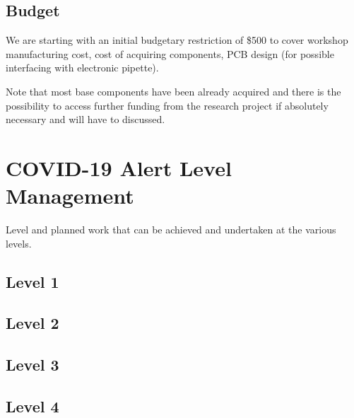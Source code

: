 \documentclass[11pt, a4paper, twoside, openright]{report}
\begin{document}
\subsection{Budget}
We are starting with an initial budgetary restriction of \$500 to cover workshop manufacturing cost, cost of acquiring components, PCB design (for possible interfacing with electronic pipette). 

Note that most base components have been already acquired and there is the possibility to access further funding from the research project if absolutely necessary and will have to discussed.  

\section{COVID-19 Alert Level Management}
Level and planned work that can be achieved and undertaken at the various levels.
\subsection{Level 1}
\subsection{Level 2}
\subsection{Level 3}
\subsection{Level 4}


\backmatter

\nocite{*}


\end{document}
